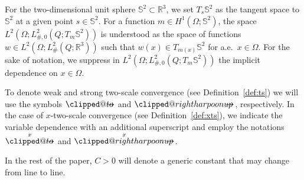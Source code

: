 \documentclass[reqno,11pt]{amsart}
\makeatletter
\numberwithin{equation}{section}
\theoremstyle{thmlemcorr}
\numberwithin{theorem}{section}
\theoremstyle{thmlemcorr*}
\theoremstyle{defi}
\theoremstyle{remexample}
\theoremstyle{ass}
\newcommand{\R}{\mathbb{R}}
\renewcommand{\S}{\mathbb{S}}
\newcommand{\1}{\mathds{1}}
\DeclareRobustCommand{\wtwoscale}{%
  \clippedrightharpoonup\mathrel{\mspace{-15mu}}\rightharpoonup
}
\newcommand{\clippedrightharpoonup}{%
  \mathrel{\mathpalette\clipped@rightharpoonup\relax}%
}
\newcommand{\clipped@rightharpoonup}[2]{%
  \sbox\z@{$\m@th#1\mspace{6mu}$}%
  \clipbox{0pt 0pt {\dimexpr\width-.5\wd\z@} 0pt}{$\m@th#1\rightharpoonup$}%
  \smash{\clipbox{{\wd\z@} 0pt 0pt {-\width}}{$\m@th#1\rightharpoonup$}}%
}
\DeclareRobustCommand{\twoscale}{%
  \clippedto\mathrel{\mspace{-15mu}}\to
}
\newcommand{\clippedto}{%
  \mathrel{\mathpalette\clipped@to\relax}%
}
\newcommand{\clipped@to}[2]{%
  \sbox\z@{$\m@th#1\mspace{6mu}$}%
  \clipbox{0pt 0pt {\dimexpr\width-.5\wd\z@} 0pt}{$\m@th#1\to$}%
  \smash{\clipbox{{\wd\z@} 0pt 0pt {-\width}}{$\m@th#1\to$}}%
}
\newcommand{\xtwoscale}{\overset{x}{\twoscale}}
\newcommand{\wxtwoscale}{\overset{x}{\wtwoscale}}
\newcommand{\Om}{\Omega}
\newcommand{\comment}[1]{{\textcolor{red}{$\langle\hspace{-0.3ex}\langle$Leon: #1$\rangle\hspace{-0.3ex}\rangle$}}}
\newcommand{\hidde}[1]{{\textcolor{orange}{$\langle\hspace{-0.3ex}\langle$Hidde: #1$\rangle\hspace{-0.3ex}\rangle$}}}
\makeatother
\begin{document}
 For the two-dimensional unit sphere \(\S^2\subset \R^3\), %
we set \(T_s\S^2\) as the tangent space to \(\S^2\) at a given point \(s\in \S^2\). For a function \(m\in H^1(\Omega;\S^2)\), the space \(L^2(\Om;L^2_{\#,0}(Q;T_m\S^2))\) is understood as the space of functions \(w\in L^2(\Om;L^2_\#(Q;\R^3))\) such that \(w(x)\in T_{m(x)}\S^2\) for a.e.~\(x\in \Omega\). For the sake of notation, we suppress in \(L^2(\Om;L^2_{\#,0}(Q;T_m\S^2))\) the implicit dependence on \(x\in \Omega\). 



To denote weak and strong two-scale convergence (see Definition~\ref{def:ts}) we will use the symbols $\twoscale$ and $\wtwoscale$, respectively. In the case of \(x\)-two-scale convergence (see Definition~\ref{def:xts}), we indicate the variable dependence with an additional superscript and employ the notations $\xtwoscale$ and $\wxtwoscale$.

In the rest of the paper, \(C>0\) will denote a generic constant that may change from line to line.




\end{document}
